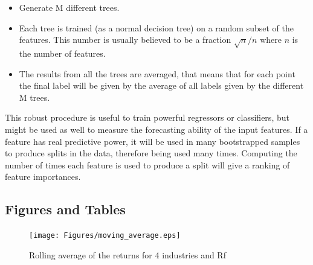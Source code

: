 \documentclass[12pt]{article} %
\numberwithin{equation}{subsection}
\begin{document}
\begin{itemize}
	\item Generate M different trees.
	\item Each tree is trained (as a normal decision tree) on a random subset of the features. This number is usually believed to be a fraction $\sqrt{n}/n$ where $n$ is the number of features.
	\item The results from all the trees are averaged, that means that for each point the final label will be given by the average of all labels given by the different M trees. 
\end{itemize}

This robust procedure is useful to train powerful regressors or classifiers, but might be used as well to measure the forecasting ability of the input features. If a feature has real predictive power, it will be used in many bootstrapped samples to produce splits in the data, therefore being used many times. Computing the number of times each feature is used to produce a split will give a ranking of feature importances.\\

\newpage
\subsection*{Figures and Tables}

\begin{figure}[htbp]
	\centering
	\texttt{[image: Figures/moving\_average.eps]}
	\caption{Rolling average of the returns for 4 industries and Rf}
	\label{rolling_average}
\end{figure}








\clearpage

\begin {table}[htbp]
\begin{center}

\end{center}
\caption {Descriptive statistics for simple returns} \label{industry_summary} 
\end {table}



\newpage

 

\end{document}
